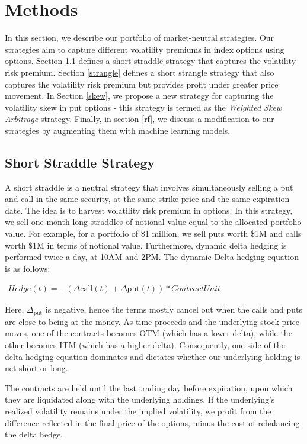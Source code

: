\documentclass[10pt]{article}
\theoremstyle{definition}
\begin{document}
\section{Methods}
In this section, we describe our portfolio of market-neutral strategies. Our strategies aim to capture different volatility premiums in index options using options. Section \ref{straddle} defines a short straddle strategy that captures the volatility risk premium. Section \ref{strangle} defines a short strangle strategy that also captures the volatility risk premium but provides profit under greater price movement. In Section \ref{skew}, we propose a new strategy for capturing the volatility skew in put options - this strategy is termed as the \textit{Weighted Skew Arbitrage} strategy. Finally, in section \ref{rf}, we discuss a modification to our strategies by augmenting them with machine learning models.

\subsection{Short Straddle Strategy} \label{straddle}

A short straddle is a neutral strategy that involves
simultaneously selling a put and call in the same security, at the same strike price and the same expiration date. The idea is to harvest volatility risk premium in options. In this strategy, we sell one-month long straddles of notional value equal to the allocated portfolio value. For example, for a portfolio of \$1 million, we sell puts worth \$1M and calls worth \$1M in terms of notional value. Furthermore, dynamic delta hedging is performed twice a day, at 10AM and 2PM. The dynamic Delta hedging equation is as follows:

\begin{center} 
$
\begin{matrix}
Hedge(t) = -(\Delta{\text{call}} (t) + \Delta{\text{put}} (t)) * \textit{ContractUnit}
\end{matrix}
$
\end{center}
Here, $\Delta_{\text{put}}$ is negative, hence the terms mostly cancel out when the calls and puts are close to being at-the-money. As time proceeds and the underlying stock price moves, one of the contracts becomes OTM (which has a lower delta), while the other becomes ITM (which has a higher delta). Consequently, one side of the delta hedging equation dominates and dictates whether our underlying holding is net short or long. 

The contracts are held until the last trading day before expiration, upon which they are liquidated along with the underlying holdings. If the underlying's realized volatility remains under the implied volatility, we profit from the difference reflected in the final price of the options, minus the cost of rebalancing the delta hedge.
\end{document}
